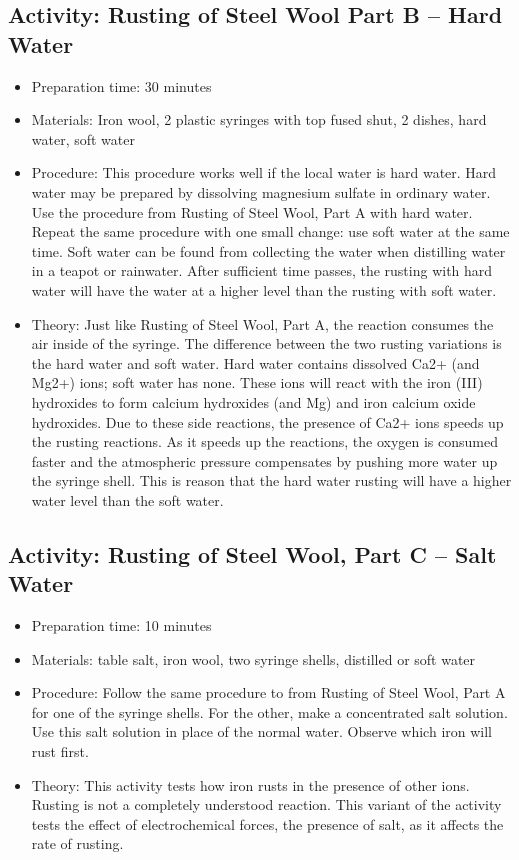 \begin{itemize}
{\subsection{Activity: Rusting of Steel Wool Part B – Hard Water}
\begin{itemize}
\item{Preparation time: 30 minutes}
\item{Materials: Iron wool, 2 plastic syringes with top fused shut, 2 dishes, hard water, soft water}
\item{Procedure: This procedure works well if the local water is hard water. Hard water may be prepared by dissolving magnesium sulfate in ordinary water. Use the procedure from Rusting of Steel Wool, Part A with hard water. Repeat the same procedure with one small change: use soft water at the same time. Soft water can be found from collecting the water when distilling water in a teapot or rainwater. After sufficient time passes, the rusting with hard water will have the water at a higher level than the rusting with soft water.}
\item{Theory: Just like Rusting of Steel Wool, Part A, the reaction consumes the air inside of the syringe. The difference between the two rusting variations is the hard water and soft water. Hard water contains dissolved Ca2+ (and Mg2+) ions; soft water has none. These ions will react with the iron (III) hydroxides to form calcium hydroxides (and Mg) and iron calcium oxide hydroxides. Due to these side reactions, the presence of Ca2+ ions speeds up the rusting reactions. As it speeds up the reactions, the oxygen is consumed faster and the atmospheric pressure compensates by pushing more water up the syringe shell. This is reason that the hard water rusting will have a higher water level than the soft water.}
\end{itemize}

\subsection{Activity: Rusting of Steel Wool, Part C – Salt Water}
\begin{itemize}
\item{Preparation time: 10 minutes}
\item{Materials: table salt, iron wool, two syringe shells, distilled or soft water}
\item{Procedure: Follow the same procedure to from Rusting of Steel Wool, Part A for one of the syringe shells. For the other, make a concentrated salt solution. Use this salt solution in place of the normal water. Observe which iron will rust first.}
\item{Theory: This activity tests how iron rusts in the presence of other ions. Rusting is not a completely understood reaction. This variant of the activity tests the effect of electrochemical forces, the presence of salt, as it affects the rate of rusting.}
\end{itemize}

}
\end{itemize}
